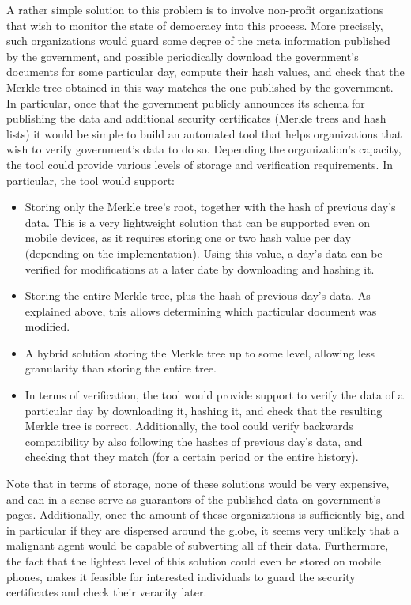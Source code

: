 A rather simple solution to this problem is to involve non-profit organizations that wish to monitor the state of democracy into this process. More precisely, such organizations would guard some degree of the meta information published by the government, and possible periodically download the government's documents for some particular day, compute their hash values, and check that the Merkle tree obtained in this way matches the one published by the government. In particular, once that the government publicly announces its schema for publishing the data and additional security certificates (Merkle trees and hash lists) it would be simple to build an automated tool that helps organizations that wish to verify government's data to do so. Depending the organization's capacity, the tool could provide various levels of storage and verification requirements. In particular, the tool would support:
\begin{itemize}
\item Storing only the Merkle tree's root, together with the hash of previous day's data. This is a very lightweight solution that can be supported even on mobile devices, as it requires storing one or two hash value per day (depending on the implementation). Using this value, a day's data can be verified for modifications at a later date by downloading and hashing it.
\item Storing the entire Merkle tree, plus the hash of previous day's data. As explained above, this allows determining which particular document was modified.
\item A hybrid solution storing the Merkle tree up to some level, allowing less granularity than storing the entire tree.
\item In terms of verification, the tool would provide support to verify the data of a particular day by downloading it, hashing it, and check that the resulting Merkle tree is correct. Additionally, the tool could verify backwards compatibility by also following the hashes of previous day's data, and checking that they match (for a certain period or the entire history).
\end{itemize}

Note that in terms of storage, none of these solutions would be very expensive, and can in a sense serve as guarantors of the published data on government's pages. Additionally, once the amount of these organizations is sufficiently big, and in particular if they are dispersed around the globe, it seems very unlikely that a malignant agent would be capable of subverting all of their data. Furthermore, the fact that the lightest level of this solution could even be stored on mobile phones, makes it feasible for interested individuals to guard the security certificates and check their veracity later.
